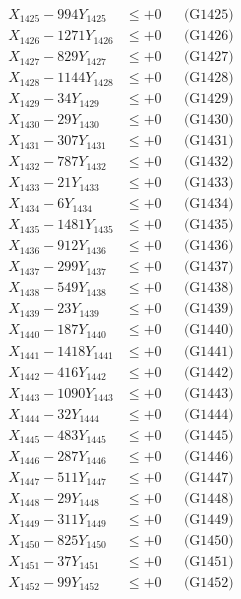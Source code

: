 \documentclass[a4paper,10pt]{article}
\begin{document}
{\begin{align}
X_{1425} - 994Y_{1425} &\leq +0 && \text{(G1425)} \\
X_{1426} - 1271Y_{1426} &\leq +0 && \text{(G1426)} \\
X_{1427} - 829Y_{1427} &\leq +0 && \text{(G1427)} \\
X_{1428} - 1144Y_{1428} &\leq +0 && \text{(G1428)} \\
X_{1429} - 34Y_{1429} &\leq +0 && \text{(G1429)} \\
X_{1430} - 29Y_{1430} &\leq +0 && \text{(G1430)} \\
\allowbreak
X_{1431} - 307Y_{1431} &\leq +0 && \text{(G1431)} \\
X_{1432} - 787Y_{1432} &\leq +0 && \text{(G1432)} \\
X_{1433} - 21Y_{1433} &\leq +0 && \text{(G1433)} \\
X_{1434} - 6Y_{1434} &\leq +0 && \text{(G1434)} \\
X_{1435} - 1481Y_{1435} &\leq +0 && \text{(G1435)} \\
X_{1436} - 912Y_{1436} &\leq +0 && \text{(G1436)} \\
X_{1437} - 299Y_{1437} &\leq +0 && \text{(G1437)} \\
X_{1438} - 549Y_{1438} &\leq +0 && \text{(G1438)} \\
X_{1439} - 23Y_{1439} &\leq +0 && \text{(G1439)} \\
X_{1440} - 187Y_{1440} &\leq +0 && \text{(G1440)} \\
\allowbreak
X_{1441} - 1418Y_{1441} &\leq +0 && \text{(G1441)} \\
X_{1442} - 416Y_{1442} &\leq +0 && \text{(G1442)} \\
X_{1443} - 1090Y_{1443} &\leq +0 && \text{(G1443)} \\
X_{1444} - 32Y_{1444} &\leq +0 && \text{(G1444)} \\
X_{1445} - 483Y_{1445} &\leq +0 && \text{(G1445)} \\
X_{1446} - 287Y_{1446} &\leq +0 && \text{(G1446)} \\
X_{1447} - 511Y_{1447} &\leq +0 && \text{(G1447)} \\
X_{1448} - 29Y_{1448} &\leq +0 && \text{(G1448)} \\
X_{1449} - 311Y_{1449} &\leq +0 && \text{(G1449)} \\
X_{1450} - 825Y_{1450} &\leq +0 && \text{(G1450)} \\
\allowbreak
X_{1451} - 37Y_{1451} &\leq +0 && \text{(G1451)} \\
X_{1452} - 99Y_{1452} &\leq +0 && \text{(G1452)} \\

\end{align}}
\end{document}
